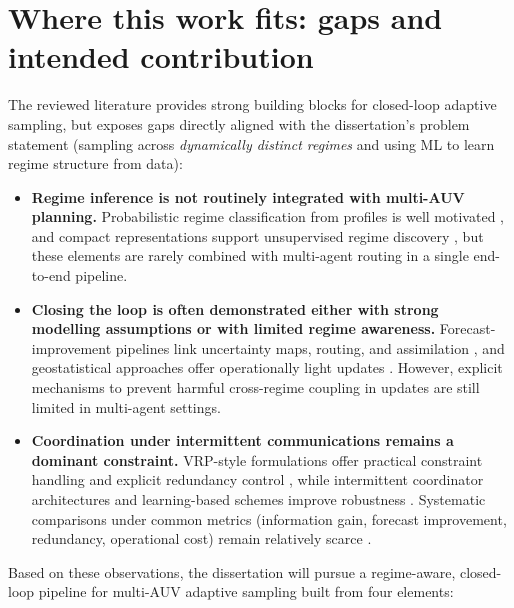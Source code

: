 \section{Where this work fits: gaps and intended contribution} \label{sec:gap_contribution}

The reviewed literature provides strong building blocks for closed-loop adaptive sampling, but exposes gaps directly aligned with the dissertation’s problem statement (sampling across \emph{dynamically distinct regimes} and using ML to learn regime structure from data):

\begin{itemize}
  \item \textbf{Regime inference is not routinely integrated with multi-AUV planning.}
  Probabilistic regime classification from profiles is well motivated \parencite{ge2023watermasses}, and compact representations support unsupervised regime discovery \parencite{fossum2020compact}, but these elements are rarely combined with multi-agent routing in a single end-to-end pipeline.

  \item \textbf{Closing the loop is often demonstrated either with strong modelling assumptions or with limited regime awareness.}
  Forecast-improvement pipelines link uncertainty maps, routing, and assimilation \parencite{bernacchi2025closingloop,mendes2025oceanmodeldriven}, and geostatistical approaches offer operationally light updates \parencite{duarte2025geostatistical}.
  However, explicit mechanisms to prevent harmful cross-regime coupling in updates are still limited in multi-agent settings.

  \item \textbf{Coordination under intermittent communications remains a dominant constraint.}
  VRP-style formulations offer practical constraint handling and explicit redundancy control \parencite{bernacchi2025closingloop}, while intermittent coordinator architectures and learning-based schemes improve robustness \parencite{dalfabbro2025douroplume}.
  Systematic comparisons under common metrics (information gain, forecast improvement, redundancy, operational cost) remain relatively scarce \parencite{hwang2019auvreview}.
\end{itemize}

Based on these observations, the dissertation will pursue a regime-aware, closed-loop pipeline for multi-AUV adaptive sampling built from four elements:

